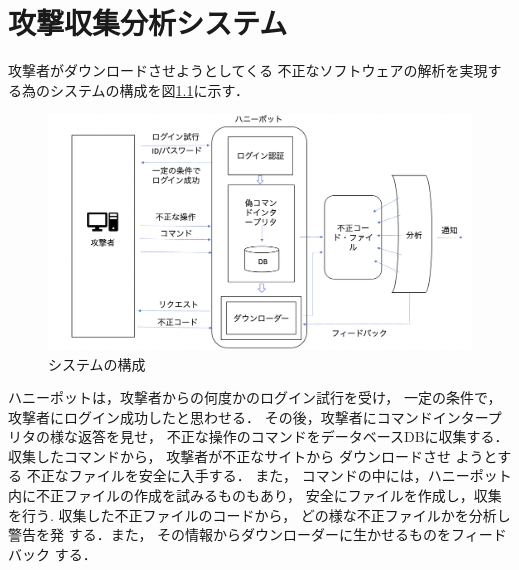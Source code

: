 \documentclass[dvipdfmx]{bta}
\begin{document}
\chapter{攻撃収集分析システム}


攻撃者がダウンロードさせようとしてくる
不正なソフトウェアの解析を実現する為のシステムの構成を図\ref{fig:system}に示す．

\begin{figure}[htbp]
	\centering
 	\includegraphics[width=\linewidth]{hpsystem2.png}
 	\caption{システムの構成}\label{fig:system}
\end{figure}






ハニーポットは，攻撃者からの何度かのログイン試行を受け，
一定の条件で，攻撃者にログイン成功したと思わせる．
その後，攻撃者にコマンドインタープリタの様な返答を見せ，
不正な操作のコマンドをデータベースDBに収集する．
% 
収集したコマンドから，
攻撃者が不正なサイトから
ダウンロードさせ
ようとする
不正なファイルを安全に入手する．
また，
コマンドの中には，ハニーポット内に不正ファイルの作成を試みるものもあり，
安全にファイルを作成し，収集を行う.
% 
収集した不正ファイルのコードから，
どの様な不正ファイルかを分析し警告を発
する．また，
その情報からダウンローダーに生かせるものをフィードバック
する．
% 
\end{document}
